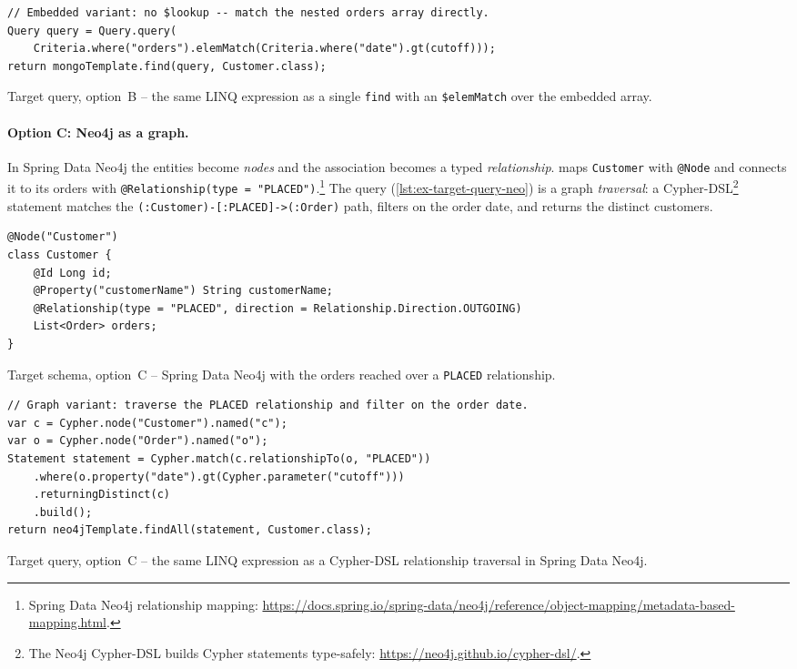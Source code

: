 \begin{listing}[H]
\begin{verbatim}
// Embedded variant: no $lookup -- match the nested orders array directly.
Query query = Query.query(
    Criteria.where("orders").elemMatch(Criteria.where("date").gt(cutoff)));
return mongoTemplate.find(query, Customer.class);
\end{verbatim}
\caption{Target query, option~B -- the same LINQ expression as a single \texttt{find} with an \texttt{\$elemMatch} over the embedded array.}
\label{lst:ex-target-query-embed}
\end{listing}

\paragraph{Option C: Neo4j as a graph.}
In Spring Data Neo4j the entities become \emph{nodes} and the association becomes a typed \emph{relationship}.  maps \texttt{Customer} with \texttt{@Node} and connects it to its orders with \texttt{@Relationship(type = "PLACED")}.\footnote{Spring Data Neo4j relationship mapping: \url{https://docs.spring.io/spring-data/neo4j/reference/object-mapping/metadata-based-mapping.html}.} The query (\cref{lst:ex-target-query-neo}) is a graph \emph{traversal}: a Cypher-DSL\footnote{The Neo4j Cypher-DSL builds Cypher statements type-safely: \url{https://neo4j.github.io/cypher-dsl/}.} statement matches the \texttt{(:Customer)-[:PLACED]->(:Order)} path, filters on the order date, and returns the distinct customers.

\begin{listing}[H]
\begin{verbatim}
@Node("Customer")
class Customer {
    @Id Long id;
    @Property("customerName") String customerName;
    @Relationship(type = "PLACED", direction = Relationship.Direction.OUTGOING)
    List<Order> orders;
}
\end{verbatim}
\caption{Target schema, option~C -- Spring Data Neo4j with the orders reached over a \texttt{PLACED} relationship.}
\label{lst:ex-target-schema-neo}
\end{listing}

\begin{listing}[H]
\begin{verbatim}
// Graph variant: traverse the PLACED relationship and filter on the order date.
var c = Cypher.node("Customer").named("c");
var o = Cypher.node("Order").named("o");
Statement statement = Cypher.match(c.relationshipTo(o, "PLACED"))
    .where(o.property("date").gt(Cypher.parameter("cutoff")))
    .returningDistinct(c)
    .build();
return neo4jTemplate.findAll(statement, Customer.class);
\end{verbatim}
\caption{Target query, option~C -- the same LINQ expression as a Cypher-DSL relationship traversal in Spring Data Neo4j.}
\label{lst:ex-target-query-neo}
\end{listing}

